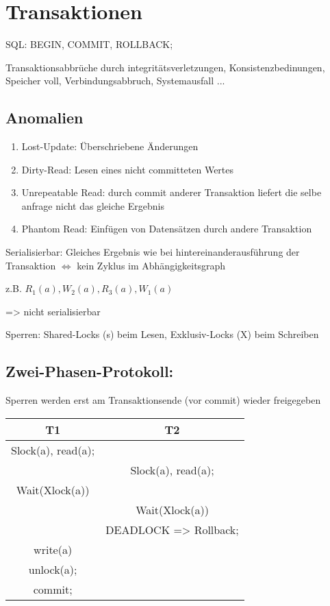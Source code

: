 \section{Transaktionen}
SQL: BEGIN, COMMIT, ROLLBACK;

Transaktionsabbrüche durch integritätsverletzungen, Konsistenzbedinungen, Speicher voll, Verbindungsabbruch, Systemausfall ...

\subsection{Anomalien}
\begin{enumerate}
\item Lost-Update: Überschriebene Änderungen
\item Dirty-Read: Lesen eines nicht committeten Wertes
\item Unrepeatable Read: durch commit anderer Transaktion liefert die selbe anfrage nicht das gleiche Ergebnis
\item Phantom Read: Einfügen von Datensätzen durch andere Transaktion
\end{enumerate}

Serialisierbar: Gleiches Ergebnis wie bei hintereinanderausführung der Transaktion
$\Leftrightarrow$ kein Zyklus im Abhängigkeitsgraph

z.B. $R_1(a), W_2(a), R_3(a), W_1(a)$
 => nicht serialisierbar

Sperren: Shared-Locks (s) beim Lesen, Exklusiv-Locks (X) beim Schreiben

\subsection{Zwei-Phasen-Protokoll:} Sperren werden erst am Transaktionsende (vor commit) wieder freigegeben

\begin{tabular}{|c|c|}
\hline
T1 & T2 \\
\hline
Slock(a), read(a); & \\
& Slock(a), read(a);\\
Wait(Xlock(a)) & \\
& Wait(Xlock(a))\\
& DEADLOCK => Rollback;\\
write(a)&\\
unlock(a);&\\
commit;&\\
\hline
\end{tabular}




